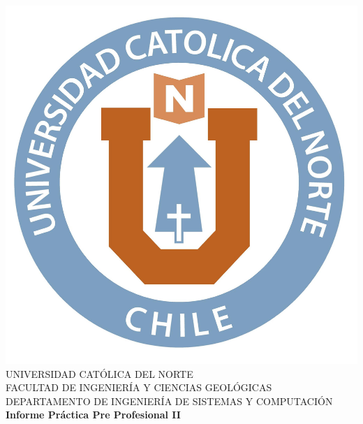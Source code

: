 \documentclass[oneside,12pt, letterpaper, titlepage]{book}
\begin{document}
\sloppy %
\renewcommand{\tablename}{Tabla}
\renewcommand{\listtablename}{Índice de Tablas}
\renewcommand{\listfigurename}{Índice de Figuras}
\setlength{\parindent}{0pt}

\onehalfspace

\begin{titlepage}
\centering
\vspace*{-0.4in}
\includegraphics[scale=0.3]{./images/u.jpg}\\
{\fontsize{14}{14}\selectfont
UNIVERSIDAD CATÓLICA DEL NORTE\\
FACULTAD DE INGENIERÍA Y CIENCIAS GEOLÓGICAS\\
DEPARTAMENTO DE INGENIERÍA DE SISTEMAS Y COMPUTACIÓN\\}
\vspace{2.3in}
{\fontsize{14}{14}\bfseries Informe Práctica Pre Profesional II\\}
\vspace*{2in}

\end{titlepage}
\end{document}
